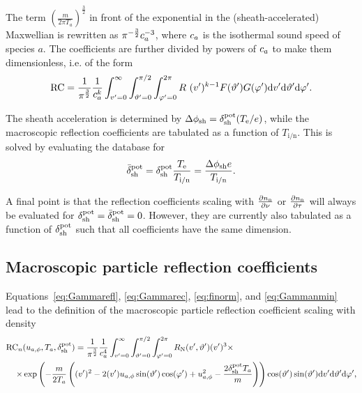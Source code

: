 The term $\left( \frac{m}{2 \pi T_a} \right)^{\frac{3}{2}}$ in front of the exponential in the (sheath-accelerated) Maxwellian is rewritten as $\pi^{-\frac{3}{2}} c_a^{-3}$, where $c_a$ is the isothermal sound speed of species $a$. The coefficients are further divided by powers of $c_a$ to make them dimensionless, i.e. of the form
\begin{equation}
\mathrm{RC} = \frac{1}{\pi^{\frac{3}{2}}} \frac{1}{c_a^{k} }\int_{v'=0}^{\infty} \int_{\vartheta'=0}^{\pi/2} \int_{\varphi'=0}^{2\pi} R \ (v')^{k-1} F(\vartheta') G(\varphi') \mathrm{d} v' \mathrm{d} \vartheta' \mathrm{d} \varphi'.
\end{equation}

The sheath acceleration is determined by $\Delta \phi_{\mathrm{sh}} = \delta_{\mathrm{sh}}^{\mathrm{pot}} ( T_{\mathrm{e}}/ e )$, while the macroscopic reflection coefficients are tabulated as a function of $T_{\mathrm{i/n}}$. This is solved by evaluating the database for
\begin{equation}
\bar{\delta}_{\mathrm{sh}}^{\mathrm{pot}} = \delta_{\mathrm{sh}}^{\mathrm{pot}} \frac{T_{\mathrm{e}}}{T_{\mathrm{i/n}}} = \frac{\Delta \phi_{\mathrm{sh}} e}{T_{\mathrm{i/n}}}.
\end{equation}

A final point is that the reflection coefficients scaling with $\frac{\partial n_\mathrm{n}}{\partial \nu}$ or $\frac{\partial n_\mathrm{n}}{\partial \tau}$ will always be evaluated for $\delta_{\mathrm{sh}}^{\mathrm{pot}} = \bar{\delta}_{\mathrm{sh}}^{\mathrm{pot}} = 0$. However, they are currently also tabulated as a function of $\delta_{\mathrm{sh}}^{\mathrm{pot}}$ such that all coefficients have the same dimension.

\subsection{Macroscopic particle reflection coefficients}

\noindent Equations~\eqref{eq:Gammarefl}, \eqref{eq:Gammarec}, \eqref{eq:finorm}, and \eqref{eq:Gammanmin} lead to the definition of the macroscopic particle reflection coefficient scaling with density
\begin{align}
   \mathrm{RC}_n & (u_{a,\phi},T_a,\delta_{\mathrm{sh}}^{\mathrm{pot}}) = \frac{1}{\pi^\frac{3}{2}} \frac{1}{c_a^4} \int_{v'=0}^{\infty} \int_{\vartheta'=0}^{\pi/2} \int_{\varphi'=0}^{2\pi}
    R_{\mathrm{N}}(v',\vartheta') (v')^3 \times \nonumber \\
    \times & \exp \left( - \frac{m}{2 T_a} \left( (v')^2-2 (v') u_{a,\phi} \sin (\vartheta') \cos(\varphi') + u_{a,\phi}^2 - \frac{2 \delta_{\mathrm{sh}}^{\mathrm{pot}} T_a}{m} \right) \right) \cos (\vartheta') \sin (\vartheta')
    \mathrm{d} v' \mathrm{d} \vartheta' \mathrm{d} \varphi', \label{eq:rconei_def}
\end{align}

